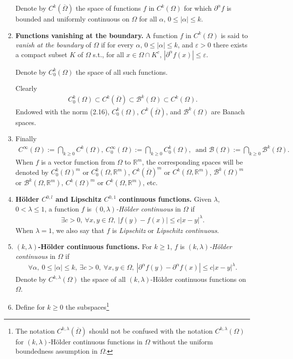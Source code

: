 \documentclass{book}
\numberwithin{equation}{section}
\begin{document}
\begin{enumerate}
    Denote by $C^k\left(\overline{\Omega}\right)$ the space of functions $f$ in $C^k(\Omega)$ for which $\partial^\alpha f$ is bounded and uniformly continuous on $\Omega$ for all $\alpha$, $0\le|\alpha|\le k$.
    \item \textbf{Functions vanishing at the boundary.} A function $f$ in $C^k(\Omega)$ is said to \textit{vanish at the boundary} of $\Omega$ if for every $\alpha$, $0\le|\alpha|\le k$, and $\varepsilon > 0$ there exists a compact subset $K$ of $\Omega$ s.t., for all $x\in\Omega\cap K^c$, $|\partial^\alpha f(x)|\le\varepsilon$.
    
    Denote by $C_0^k(\Omega)$ the space of all such functions.
    
    Clearly
    \begin{align*}
        \boxed{C_0^k(\Omega)\subset C^k(\overline{\Omega})\subset\mathcal{B}^k(\Omega)\subset C^k(\Omega).}
    \end{align*}
    Endowed with the norm (2.16), $C_0^k(\Omega)$, $C^k(\overline{\Omega})$, and $\mathcal{B}^k(\Omega)$ are Banach spaces.
    \item Finally
    \begin{align*}
        C^\infty(\Omega) := \bigcap_{k\ge 0} C^k(\Omega),\ C_0^\infty(\Omega) := \bigcap_{k\ge 0} C_0^k(\Omega),\ \mbox{ and } \mathcal{B}(\Omega) := \bigcap_{k\ge 0} \mathcal{B}^k(\Omega).
    \end{align*}
    When $f$ is a vector function from $\Omega$ to $\mathbb{R}^m$, the corresponding spaces will be denoted by $C_0^k(\Omega)^m$ or $C_0^k(\Omega,\mathbb{R}^m)$, $C^k(\overline{\Omega})^m$ or $C^k(\Omega,\mathbb{R}^m)$, $\mathcal{B}^k(\Omega)^m$ or $\mathcal{B}^k(\Omega,\mathbb{R}^m)$, $C^k(\Omega)^m$ or $C^k(\Omega,\mathbb{R}^m)$, etc.
    \item \textbf{H\"older $C^{0,l}$ and Lipschitz $C^{0,1}$ continuous functions.} Given $\lambda$, $0 < \lambda\le 1$, a function $f$ is \textit{$(0,\lambda)$-Hölder continuous} in $\Omega$ if
    \begin{align*}
        \exists c > 0,\ \forall x,y\in\Omega,\ \left|f(y) - f(x)\right|\le c\left|x - y\right|^\lambda.
    \end{align*}
    When $\lambda = 1$, we also say that $f$ is \textit{Lipschitz} or \textit{Lipschitz continuous}.
    \item \textbf{$(k,\lambda)$-H\"older continuous functions.} For $k\ge 1$, $f$ is \textit{$(k,\lambda)$-Hölder continuous} in $\Omega$ if
    \begin{align*}
        \forall\alpha,\ 0\le|\alpha|\le k,\ \exists c > 0,\ \forall x,y\in\Omega,\ \left|\partial^\alpha f(y) - \partial^\alpha f(x)\right|\le c\left|x - y\right|^\lambda.
    \end{align*}
    Denote by $C^{k,\lambda}(\Omega)$ the space of all $(k,\lambda)$-Hölder continuous functions on $\Omega$.
    \item Define for $k\ge 0$ the subspaces\footnote{The notation $C^{k,\lambda}(\overline{\Omega})$ should not be confused with the notation $C^{k,\lambda}(\Omega)$ for $(k,\lambda)$-Hölder continuous functions in $\Omega$ without the uniform boundedness assumption in $\Omega$.
        
}
\end{enumerate}
\end{document}

